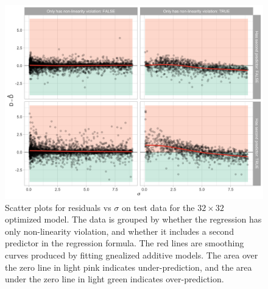 \documentclass[]{interact}
\theoremstyle{plain}%
\theoremstyle{definition}
\theoremstyle{remark}
\begin{document}
\begin{figure}[!h]

{\centering \includegraphics[width=1\linewidth]{paper_files/figure-latex/over-under-1} 

}

\caption{Scatter plots for residuals vs $\sigma$ on test data for the $32 \times 32$ optimized model. The data is grouped by whether the regression has only non-linearity violation, and whether it includes a second predictor in the regression formula. The red lines are smoothing curves produced by fitting gnealized additive models. The area over the zero line in light pink indicates under-prediction, and the area under the zero line in light green indicates over-prediction.}\label{fig:over-under}
\end{figure}

\begin{table}

\caption{\label{tab:performance-sub}The training and test performance of the $32 \times 32$ model presented with different model violations.}
\centering
{}
\end{table}
\end{document}
